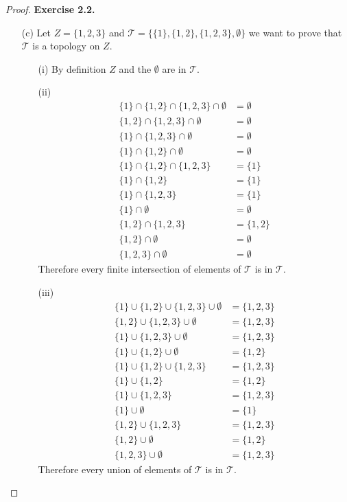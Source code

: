 \documentclass[11pt]{article}
\newcommand{\Topo}{\mathcal{T}}
\theoremstyle{definition}
\begin{document}
\begin{proof}{\textbf{Exercise 2.2.}}
\begin{itemize}
\begin{itemize}
    \end{itemize}
    \item [(c)] Let $Z = \{1,2,3\}$ and
    $\Topo = \{\{1\}, \{1,2\}, \{1,2,3\}, \emptyset\}$ we want to prove that
    $\Topo$ is a topology on $Z$.
    \begin{itemize}
        \item [(i)] By definition $Z$ and the $\emptyset$ are in $\Topo$.
        \item [(ii)]
        \begin{align*}
            \{1\} \cap \{1,2\} \cap \{1,2,3\} \cap \emptyset &= \emptyset\\
            \{1,2\} \cap \{1,2,3\} \cap \emptyset &= \emptyset\\
            \{1\} \cap \{1,2,3\} \cap \emptyset &= \emptyset\\
            \{1\} \cap \{1,2\} \cap \emptyset &= \emptyset\\
            \{1\} \cap \{1,2\} \cap \{1,2,3\} &= \{1\}\\
            \{1\} \cap \{1,2\} &= \{1\}\\
            \{1\} \cap \{1,2,3\} &= \{1\}\\  
            \{1\} \cap \emptyset &= \emptyset\\
            \{1,2\} \cap \{1,2,3\} &= \{1,2\}\\  
            \{1,2\} \cap \emptyset &= \emptyset\\  
            \{1,2,3\} \cap \emptyset &= \emptyset  
        \end{align*}
        Therefore every finite intersection of elements of $\Topo$ is in $\Topo$.
        \item [(iii)] 
        \begin{align*}
            \{1\} \cup \{1,2\} \cup \{1,2,3\} \cup \emptyset &= \{1,2,3\}\\
            \{1,2\} \cup \{1,2,3\} \cup \emptyset &= \{1,2,3\}\\
            \{1\} \cup \{1,2,3\} \cup \emptyset &= \{1,2,3\}\\
            \{1\} \cup \{1,2\} \cup \emptyset &= \{1,2\}\\
            \{1\} \cup \{1,2\} \cup \{1,2,3\} &= \{1,2,3\}\\
            \{1\} \cup \{1,2\} &= \{1,2\}\\
            \{1\} \cup \{1,2,3\} &= \{1,2,3\}\\  
            \{1\} \cup \emptyset &= \{1\}\\
            \{1,2\} \cup \{1,2,3\} &= \{1,2,3\}\\  
            \{1,2\} \cup \emptyset &= \{1,2\}\\  
            \{1,2,3\} \cup \emptyset &= \{1,2,3\}  
        \end{align*}
        Therefore every union of elements of $\Topo$ is in $\Topo$.
    \end{itemize}
    \end{itemize}
\end{proof}
\end{document}
